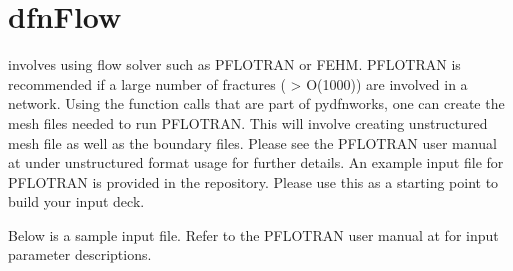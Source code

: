 \documentclass[letterpaper,10pt,english]{sphinxmanual}
\begin{document}
\begin{sphinxVerbatim}[commandchars=\\\{\}]
 

   

\end{sphinxVerbatim}


\chapter{dfnFlow}
\label{\detokenize{dfnflow:dfnflow}}\label{\detokenize{dfnflow:dfnflow-chapter}}\label{\detokenize{dfnflow::doc}}
 involves using flow solver such as PFLOTRAN or FEHM. PFLOTRAN is recommended if a large number of fractures ( \textgreater{} O(1000)) are involved in a network. Using the function calls that are part of pydfnworks, one can create the mesh files needed to run PFLOTRAN. This will involve creating unstructured mesh file  as well as the boundary   files. Please see the PFLOTRAN user manual at  under unstructured  format usage for further details. An example input file for PFLOTRAN is provided in the repository. Please use this as a starting point to build your input deck.

Below is a sample input file. Refer to the PFLOTRAN user manual at  for input parameter descriptions.
\end{document}

